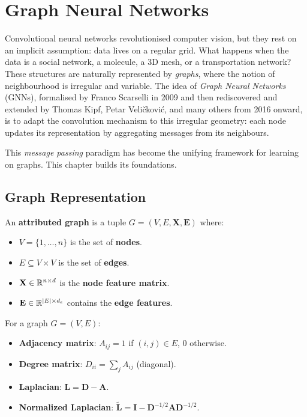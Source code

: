 \chapter{Graph Neural Networks}
\label{ch:gnn}

Convolutional neural networks revolutionised computer vision, but they rest on an implicit assumption: data lives on a regular grid. What happens when the data is a social network, a molecule, a 3D mesh, or a transportation network? These structures are naturally represented by \emph{graphs}, where the notion of neighbourhood is irregular and variable. The idea of \emph{Graph Neural Networks} (GNNs), formalised by Franco Scarselli in 2009 and then rediscovered and extended by Thomas Kipf, Petar Veli\v{c}kovi\'c, and many others from 2016 onward, is to adapt the convolution mechanism to this irregular geometry: each node updates its representation by aggregating messages from its neighbours.

This \emph{message passing} paradigm has become the unifying framework for learning on graphs. This chapter builds its foundations.

\section{Graph Representation}

\begin{definition}
An \textbf{attributed graph} is a tuple $G = (V, E, \mathbf{X}, \mathbf{E})$ where:
\begin{itemize}
    \item $V = \{1, \ldots, n\}$ is the set of \textbf{nodes}.
    \item $E \subseteq V \times V$ is the set of \textbf{edges}.
    \item $\mathbf{X} \in \mathbb{R}^{n \times d}$ is the \textbf{node feature matrix}.
    \item $\mathbf{E} \in \mathbb{R}^{\left| E \right| \times d_e}$ contains the \textbf{edge features}.
\end{itemize}
\end{definition}

\begin{definition}
For a graph $G = (V, E)$:
\begin{itemize}
    \item \textbf{Adjacency matrix}: $A_{ij} = 1$ if $(i,j) \in E$, $0$ otherwise.
    \item \textbf{Degree matrix}: $D_{ii} = \sum_j A_{ij}$ (diagonal).
    \item \textbf{Laplacian}: $\mathbf{L} = \mathbf{D} - \mathbf{A}$.
    \item \textbf{Normalized Laplacian}:
          $\tilde{\mathbf{L}} = \mathbf{I} - \mathbf{D}^{-1/2}\mathbf{A}\mathbf{D}^{-1/2}$.
\end{itemize}
\end{definition}

